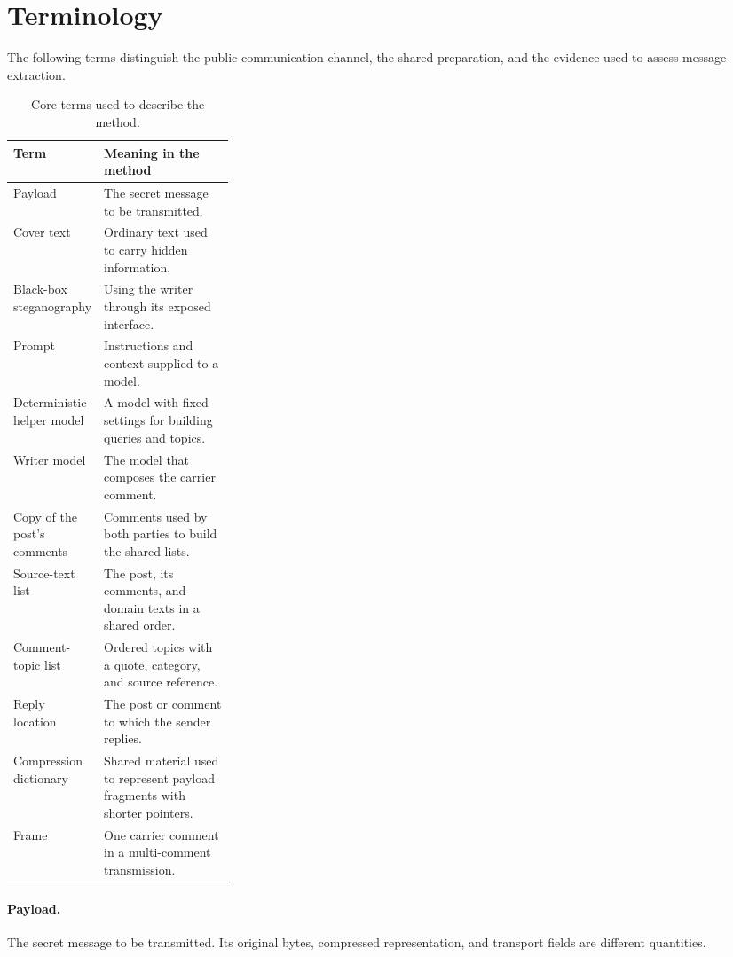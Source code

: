 \section{Terminology}
\label{sec:terminology}

The following terms distinguish the public communication channel, the shared preparation, and the evidence used to assess message extraction.

\begin{table}[H]
\centering\small
\caption{Core terms used to describe the method.}
\label{tab:terminology}
\begin{tabularx}{\linewidth}{|p{0.29\linewidth}|X|}
\hline
Term & Meaning in the method \\
\hline
Payload & The secret message to be transmitted. \\
\hline
Cover text & Ordinary text used to carry hidden information. \\
\hline
Black-box steganography & Using the writer through its exposed interface. \\
\hline
Prompt & Instructions and context supplied to a model. \\
\hline
Deterministic helper model & A model with fixed settings for building queries and topics. \\
\hline
Writer model & The model that composes the carrier comment. \\
\hline
Copy of the post's comments & Comments used by both parties to build the shared lists. \\
\hline
Source-text list & The post, its comments, and domain texts in a shared order. \\
\hline
Comment-topic list & Ordered topics with a quote, category, and source reference. \\
\hline
Reply location & The post or comment to which the sender replies. \\
\hline
Compression dictionary & Shared material used to represent payload fragments with shorter pointers. \\
\hline
Frame & One carrier comment in a multi-comment transmission. \\
\hline
\end{tabularx}
\end{table}

\paragraph{Payload.}
The secret message to be transmitted. Its original bytes, compressed representation, and transport fields are different quantities.

